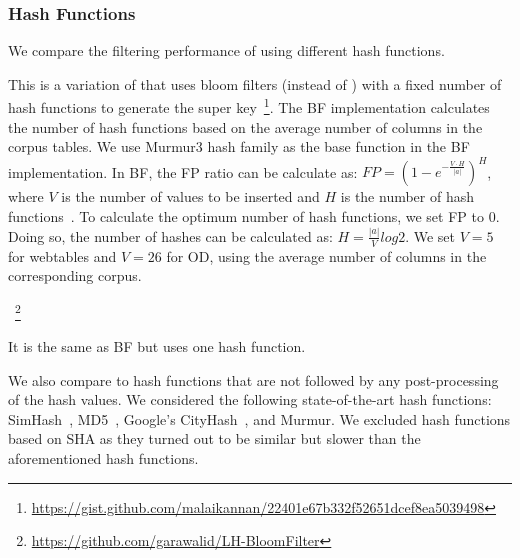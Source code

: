 \subsubsection{Hash Functions} \label{subsec_baseline_hash}
We compare the filtering performance of \system using different hash functions.

 This is a variation of \system that uses bloom filters (instead of \hash) with a fixed number of hash functions to generate the super key~\footnote{\url{https://gist.github.com/malaikannan/22401e67b332f52651dcef8ea5039498}}.
The BF implementation calculates the number of hash functions based on the average number of columns in the corpus tables. We use Murmur3 hash family as the base function in the BF implementation. 
In BF, the FP ratio can be calculate as: $FP = (1-e^{-\frac{V\cdot H}{|a|}})^H$, where $V$ is the number of values to be inserted and $H$ is the number of hash functions~\cite{fan2000summary}. To calculate the optimum number of hash functions, we set FP to $0$. Doing so, the number of hashes can be calculated as: $H = \frac{|a|}{V} log2$.
We set $V=5$ for webtables and $V=26$ for OD, using the average number of columns in the corresponding corpus.

~\footnote{\url{https://github.com/garawalid/LH-BloomFilter}}

It is the same as BF but uses one hash function. 

We also compare \system to hash functions that are not followed by any post-processing of the hash values. 
We considered the following state-of-the-art hash functions: SimHash~\cite{charikar2002similarity, sadowski2007simhash}, MD5~\cite{rivest1992md5}, Google's CityHash~\cite{pike2017cityhash}, and Murmur.
We excluded hash functions based on SHA as they turned out to be similar but slower than the aforementioned hash functions.

